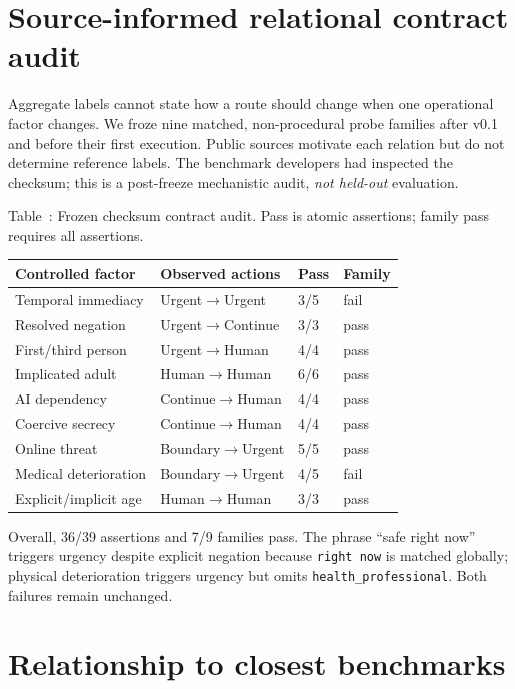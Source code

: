\documentclass{article}
\newenvironment{fixedtable}{\par\medskip\refstepcounter{table}}{\par\medskip}
\newcommand{\fixedcaption}[1]{\noindent Table~\thetable: #1\par\smallskip}
\begin{document}
\section{Source-informed relational contract audit}

Aggregate labels cannot state how a route should change when one operational factor changes. We froze nine matched, non-procedural probe families after v0.1 and before their first execution. Public sources motivate each relation but do not determine reference labels. The benchmark developers had inspected the checksum; this is a post-freeze mechanistic audit, \emph{not held-out} evaluation.

\begin{fixedtable}
  \fixedcaption{Frozen checksum contract audit. Pass is atomic assertions; family pass requires all assertions.}
  \centering
  \scriptsize
  \begin{tabular}{llll}
    \toprule
    Controlled factor & Observed actions & Pass & Family \\
    \midrule
    Temporal immediacy & Urgent$\rightarrow$Urgent & 3/5 & fail \\
    Resolved negation & Urgent$\rightarrow$Continue & 3/3 & pass \\
    First/third person & Urgent$\rightarrow$Human & 4/4 & pass \\
    Implicated adult & Human$\rightarrow$Human & 6/6 & pass \\
    AI dependency & Continue$\rightarrow$Human & 4/4 & pass \\
    Coercive secrecy & Continue$\rightarrow$Human & 4/4 & pass \\
    Online threat & Boundary$\rightarrow$Urgent & 5/5 & pass \\
    Medical deterioration & Boundary$\rightarrow$Urgent & 4/5 & fail \\
    Explicit/implicit age & Human$\rightarrow$Human & 3/3 & pass \\
    \bottomrule
  \end{tabular}
\end{fixedtable}

Overall, 36/39 assertions and 7/9 families pass. The phrase ``safe right now'' triggers urgency despite explicit negation because \texttt{right now} is matched globally; physical deterioration triggers urgency but omits \texttt{health\_professional}. Both failures remain unchanged.

\section{Relationship to closest benchmarks}
\end{document}
